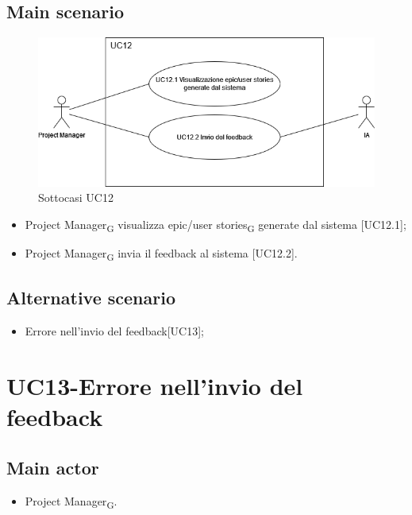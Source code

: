 \documentclass{article}
\begin{document}
    \subsection*{Main scenario}
        \begin{figure}[h]
          \centering
          \includegraphics[width=.8\textwidth, height=.6\textheight, keepaspectratio]{documenti/imgUML/UC12-zoom.drawio.png}
          \caption{Sottocasi UC12}
          \label{fig:UC12_sottocasi}
        \end{figure}

        \begin{itemize}
            \item Project Manager\textsubscript{G} visualizza epic/user stories\textsubscript{G} generate dal sistema [UC12.1];
            \item Project Manager\textsubscript{G} invia il feedback al sistema [UC12.2].
        \end{itemize}
        
    \subsection*{Alternative scenario}
        
        \begin{itemize}
            \item Errore nell'invio del feedback[UC13];
        \end{itemize}
        
\section{UC13-Errore nell'invio del feedback}

     \subsection*{Main actor}
     \begin{itemize}
         \item Project Manager\textsubscript{G}.
     \end{itemize}
\end{document}
